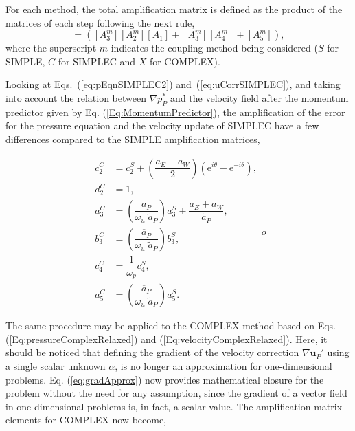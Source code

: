 \documentclass[final,3p,times,11pt,onecolumn]{myElsarticle}
\numberwithin{equation}{section}
\begin{document}
For each method, the total amplification matrix is defined as the product of the matrices of each step following the next rule,
\begin{equation}
[A^m] = ([A^m_3] [A^m_2] [A_1] + [A^m_3] [A^m_4] + [A^m_5]),
\end{equation}
where the superscript $m$ indicates the coupling method being considered ($S$ for SIMPLE, $C$ for SIMPLEC and $X$ for COMPLEX).

Looking at Eqs.~(\ref{eq:pEqnSIMPLEC2}) and~(\ref{eq:uCorrSIMPLEC}), and taking into account the relation between $\nabla p_P^*$ and the velocity field after the momentum predictor given by Eq. (\ref{Eq:MomentumPredictor}), the amplification of the error for the pressure equation and the velocity update of SIMPLEC have a few differences compared to the SIMPLE amplification matrices,

\begin{equation}
\begin{split}
     c^C_2 &= c_2^S + \left(\dfrac{a_E + a_W}{2}\right) (\text{e}^{i    \theta} - \text{e}^{-i \theta}), \\
     d^C_2 &= 1, \\
     a^C_3 &= \left(\dfrac{\overline{a}_P}{\omega_u \; \tilde{a}_P}\right) a_3^S + \dfrac{a_E+a_W}{\tilde{a}_P}, \\
     b^C_3 &= \left(\dfrac{\overline{a}_P}{\omega_u \; \tilde{a}_P}\right) b_3^S, \\ 
     c^C_4 &= \dfrac{1}{\omega_p} c^S_4, \\
     a^C_5 &= \left(\dfrac{\overline{a}_P}{\omega_u \; \tilde{a}_P}\right) a^S_5. 
\end{split}
o \end{equation}

The same procedure may be applied to the COMPLEX method based on Eqs. (\ref{Eq:pressureComplexRelaxed}) and (\ref{Eq:velocityComplexRelaxed}). Here, it should be noticed that defining the gradient of the velocity correction $\nabla \boldsymbol{u}_P'$ using a single scalar unknown $\alpha$, is no longer an approximation for one-dimensional problems. Eq. (\ref{eq:gradApprox}) now provides mathematical closure for the problem without the need for any assumption, since the gradient of a vector field in one-dimensional problems is, in fact, a scalar value. The amplification matrix elements for COMPLEX now become,
\end{document}
